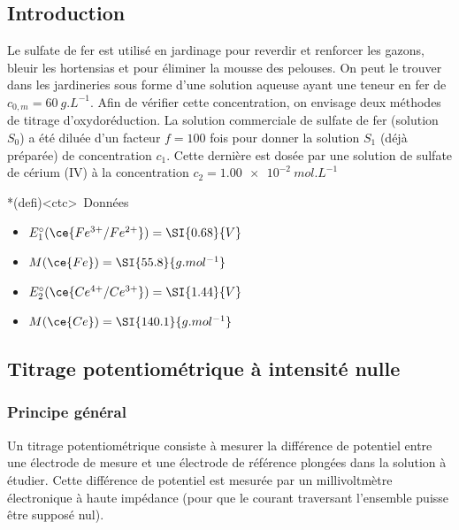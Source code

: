 \documentclass[../main/main.tex]{subfiles}
\begin{document}
{	\subsection{Introduction}
	Le sulfate de fer est utilisé en jardinage pour reverdir et renforcer les
	gazons, bleuir les hortensias et pour éliminer la mousse des pelouses. On peut
	le trouver dans les jardineries sous forme d'une solution aqueuse ayant une
	teneur en fer de $c_{0,m} = \SI{60}{g.L^{-1}}$. Afin de vérifier cette
	concentration, on envisage deux méthodes de titrage d'oxydoréduction.
	\bigbreak
	La solution commerciale de sulfate de fer (solution $S_0$) a été diluée d'un
	facteur $f = 100$ fois pour donner la solution $S_1$ (déjà préparée) de
	concentration $c_1$. Cette dernière est dosée par une solution de sulfate de
	cérium (IV) à la concentration $c_2 = \SI{1.00e-2}{mol.L^{-1}}$
	\begin{tcn}*(defi)<ctc>{\icondata~Données}
		\begin{itemize}
			\item $E_1^\circ(\ce{Fe^{3+}/Fe^{2+}}) = \SI{0.68}{V}$
			\item $M (\ce{Fe}) = \SI{55.8}{g.mol^{-1}}$
			\item $E_2^\circ (\ce{Ce^{4+}/Ce^{3+}}) = \SI{1.44}{V}$
			\item $M (\ce{Ce}) = \SI{140.1}{g.mol^{-1}}$
		\end{itemize}
	\end{tcn}

	\subsection{Titrage potentiométrique à intensité nulle}
	\subsubsection{Principe général}
	Un titrage potentiométrique consiste à mesurer la différence de potentiel entre
	une électrode de mesure et une électrode de référence plongées dans la solution
	à étudier. Cette différence de potentiel est mesurée par un millivoltmètre
	électronique à haute impédance (pour que le courant traversant l'ensemble puisse
	être supposé nul).

}
\end{document}
